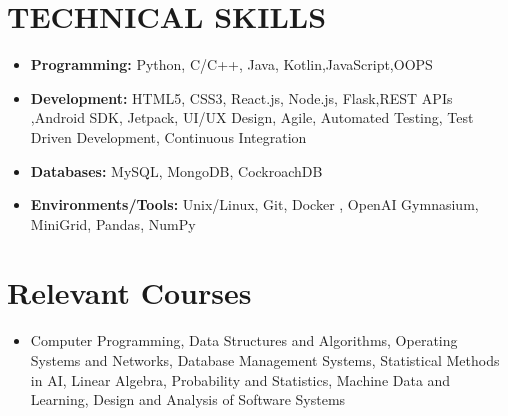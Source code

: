 \documentclass[a4paper,10pt]{article}
\begin{document}
\section{TECHNICAL SKILLS}
\begin{itemize}[leftmargin=0.3in, itemsep=0pt, topsep=0pt]
    \item \textbf{Programming:} Python, C/C++, Java, Kotlin,JavaScript,OOPS
    \item \textbf{Development:} HTML5, CSS3, React.js, Node.js, Flask,REST APIs ,Android SDK, Jetpack, UI/UX Design, Agile, Automated Testing, Test Driven Development, Continuous Integration
    \item \textbf{Databases:} MySQL, MongoDB, CockroachDB
   \item \textbf{Environments/Tools:} Unix/Linux, Git, Docker , OpenAI Gymnasium, MiniGrid, Pandas, NumPy
\end{itemize}

\section{\textcolor{headercolor}{Relevant Courses}}
\begin{itemize}[leftmargin=0.3in, itemsep=0pt, topsep=0pt]
    \item Computer Programming, Data Structures and Algorithms, Operating Systems and Networks, Database Management Systems, Statistical Methods in AI, Linear Algebra, Probability and Statistics, Machine Data and Learning, Design and Analysis of Software Systems
\end{itemize}
\end{document}
